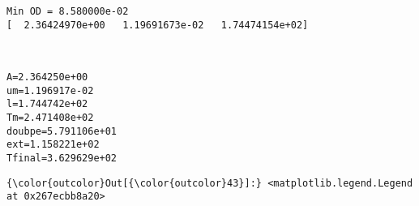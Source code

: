 \documentclass[11pt]{article}
\begin{document}
    \begin{Verbatim}[commandchars=\\\{\}]
Min OD = 8.580000e-02
[  2.36424970e+00   1.19691673e-02   1.74474154e+02]

    \end{Verbatim}

    \begin{center}
    \end{center}
    { \hspace*{\fill} \\}
    
    \begin{Verbatim}[commandchars=\\\{\}]
A=2.364250e+00
um=1.196917e-02
l=1.744742e+02
Tm=2.471408e+02
doubpe=5.791106e+01
ext=1.158221e+02
Tfinal=3.629629e+02

    \end{Verbatim}

            \begin{Verbatim}[commandchars=\\\{\}]
{\color{outcolor}Out[{\color{outcolor}43}]:} <matplotlib.legend.Legend at 0x267ecbb8a20>
\end{Verbatim}
        
    \begin{center}
    \end{center}
    { \hspace*{\fill} \\}
    
    \begin{center}
    \end{center}
    { \hspace*{\fill} \\}
    
\end{document}
